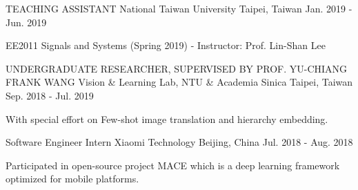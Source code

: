 

\begin{cventries}

\cventry
    {TEACHING ASSISTANT} %
    {National Taiwan University} %
    {Taipei, Taiwan} %
    {Jan. 2019 - Jun. 2019} %
    {
      \begin{cvitems} %
        \item {EE2011 Signals and Systems (Spring 2019) - Instructor: Prof. Lin-Shan Lee}
      \end{cvitems}
    }



  \cventry
    {UNDERGRADUATE RESEARCHER, SUPERVISED BY PROF. YU-CHIANG FRANK WANG } %
    {Vision \& Learning Lab, NTU \& Academia Sinica} %
    {Taipei, Taiwan} %
    {Sep. 2018 - Jul. 2019} %
    {
      \begin{cvitems} %
        \item {With special effort on Few-shot image translation and hierarchy embedding.}
      \end{cvitems}
    }




  \cventry
    {Software Engineer Intern} %
    {Xiaomi Technology} %
    {Beijing, China} %
    {Jul. 2018 - Aug. 2018} %
    {
      \begin{cvitems} %
        \item {Participated in open-source project MACE which is a deep learning framework optimized for mobile platforms.}
      \end{cvitems}
    }

\end{cventries}
